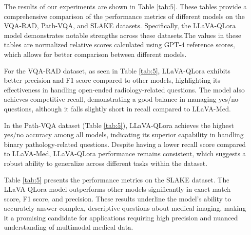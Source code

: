 \documentclass[10pt,letterpaper]{article}
\begin{document}

The results of our experiments are shown in Table \ref{tab:5}. These tables provide a comprehensive comparison of the performance metrics of different models on the VQA-RAD, Path-VQA, and SLAKE datasets. Specifically, the LLaVA-QLora model demonstrates notable strengths across these datasets.The values in these tables are normalized relative scores calculated using GPT-4 reference scores, which allows for better comparison between different models.

For the VQA-RAD dataset, as seen in Table \ref{tab:5}, LLaVA-QLora exhibits better precision and F1 score compared to other models, highlighting its effectiveness in handling open-ended radiology-related questions. The model also achieves competitive recall, demonstrating a good balance in managing yes/no questions, although it falls slightly short in recall compared to LLaVA-Med.

In the Path-VQA dataset (Table \ref{tab:5}), LLaVA-QLora achieves the highest yes/no accuracy among all models, indicating its superior capability in handling binary pathology-related questions. Despite having a lower recall score compared to LLaVA-Med, LLaVA-QLora performance remains consistent, which suggests a robust ability to generalize across different tasks within the dataset.

Table \ref{tab:5} presents the performance metrics on the SLAKE dataset. The LLaVA-QLora model outperforms other models significantly in exact match score, F1 score, and precision. These results underline the model's ability to accurately answer complex, descriptive questions about medical imaging, making it a promising candidate for applications requiring high precision and nuanced understanding of multimodal medical data.
\end{document}
